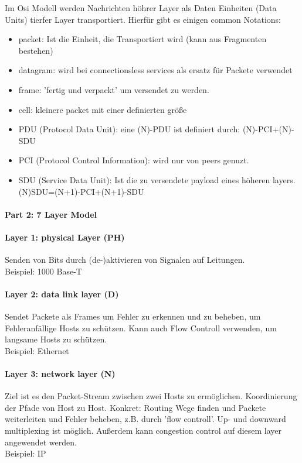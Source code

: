                 Im Osi Modell werden Nachrichten höhrer Layer als Daten Einheiten (Data Units) tierfer Layer transportiert. Hierfür gibt es einigen common Notations: 
                \begin{itemize}
                    \item packet: Ist die Einheit, die Transportiert wird (kann aus Fragmenten bestehen)
                    \item datagram: wird bei connectionsless services als ersatz für Packete verwendet
                    \item frame: 'fertig und verpackt' um versendet zu werden.
                    \item cell: kleinere packet mit einer definierten größe
                    \item PDU (Protocol Data Unit): eine (N)-PDU ist definiert durch: (N)-PCI+(N)-SDU
                    \item PCI (Protocol Control Information): wird nur von peers genuzt.
                    \item SDU (Service Data Unit): Ist die zu versendete payload eines höheren layers. (N)SDU=(N+1)-PCI+(N+1)-SDU
                \end{itemize}
            \paragraph{Part 2: 7 Layer Model}
                \paragraph{Layer 1: physical Layer (PH)}
                    Senden von Bits durch (de-)aktivieren von Signalen auf Leitungen. \\
                    Beispiel: 1000 Base-T
                
                \paragraph{Layer 2: data link layer (D)}
                    Sendet Packete als Frames um Fehler zu erkennen und zu beheben, um Fehleranfällige Hosts zu schützen. Kann auch Flow Controll verwenden, um langsame Hosts zu schützen. \\
                    Beispiel: Ethernet
                
                \paragraph{Layer 3: network layer (N)}
                    Ziel ist es den Packet-Stream zwischen zwei Hosts zu ermöglichen. Koordinierung der Pfade von Host zu Host. Konkret: Routing Wege finden und Packete weiterleiten und Fehler beheben, z.B. durch 'flow controll'. Up- und downward multiplexing ist möglich. Außerdem kann congestion control auf diesem layer angewendet werden.\\
                    Beispiel: IP

